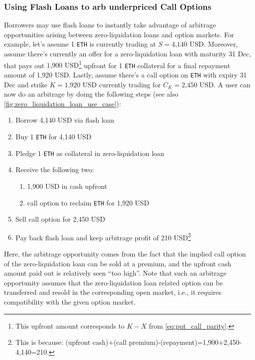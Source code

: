 \documentclass[a4paper]{article}
\begin{document}
\subsubsection{Using Flash Loans to arb underpriced Call Options}
Borrowers may use flash loans to instantly take advantage of arbitrage opportunities arising between zero-liquidation loans and option markets. For example, let's assume 1 \verb|ETH| is currently trading at $S=\textrm{4,140 USD}$. Moreover, assume there's currently an offer for a zero-liquidation loan with maturity 31 Dec, that pays out $\textrm{1,900 USD}$\footnote{This upfront amount corresponds to $K-X$ from \cref{eq:put_call_parity}.} upfront for 1 \verb|ETH| collateral for a final repayment amount of 1,920 USD. Lastly, assume there's a call option on \verb|ETH| with expiry 31 Dec and strike $K=\textrm{1,920 USD}$ currently trading for $C_K=\textrm{2,450 USD}$. A user can now do an arbitrage by doing the following steps (see also \cref{fig:zero_liquidation_loan_use_case}):
\begin{enumerate}
\item Borrow 4,140 USD via flash loan 
\item Buy 1 \verb|ETH| for 4,140 USD
\item Pledge 1 \verb|ETH| as collateral in zero-liquidation loan
\item Receive the following two:
\begin{enumerate}
\item 1,900 USD in cash upfront
\item call option to reclaim \verb|ETH| for 1,920 USD
\end{enumerate}
\item Sell call option for 2,450 USD
\item Pay back flash loan and keep arbitrage profit of 210 USD\footnote{This is because: (upfront cash)+(call premium)-(repayment)=1,900+2,450-4,140=210.}
\end{enumerate}
Here, the arbitrage opportunity comes from the fact that the implied call option of the zero-liquidation loan can be sold at a premium, and the upfront cash amount paid out is relatively seen ``too high''. Note that such an arbitrage opportunity assumes that the zero-liquidation loan related option can be transferred and resold in the corresponding open market, i.e., it requires compatibility with the given option market.
\end{document}
